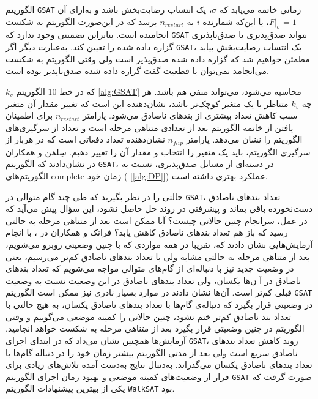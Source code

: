 الگوریتم 
\texttt{GSAT}
زمانی خاتمه می‌یابد  که 
$\sigma$، 
یک انتساب رضایت‌بخش باشد و به‌ازای آن 
$F|_{\sigma} = 1$، 
یا این‌که شمارنده 
$i$
به 
$n_{restart}$
برسد که در این‌صورت الگوریتم به شکست انجامیده است.  بنابراین تضمینی وجود ندارد که 
\texttt{GSAT}
بتواند صدق‌پذیری یا صدق‌ناپذیری گزاره داده شده را تعیین کند.   به‌عبارت  دیگر اگر 
\texttt{GSAT}،
یک انتساب رضایت‌بخش بیابد مطمئن خواهیم شد که گزاره داده شده صدق‌پذیر است ولی وقتی الگوریتم به شکست می‌انجامد  نمی‌توان با قطعیت گفت گزاره داده شده صدق‌ناپذیر بوده است.   


$k_{v}$
که در خط 
$10$
الگوریتم 
\ref{alg:GSAT}
محاسبه می‌شود، می‌تواند منفی هم باشد.  هر چه
$k_{v}$
متناظر با  یک متغیر  کوچک‌تر باشد، نشان‌دهنده این است که تغییر مقدار آن متغیر سبب کاهش تعداد بیشتری از بندهای ناصادق می‌شود.   پارامتر 
$n_{restart}$
برای اطمینان یافتن از خاتمه الگوریتم بعد از تعدادی متناهی مرحله  است و تعداد از سرگیری‌های الگوریتم را نشان می‌دهد. پارامتر 
$n_{flip}$
نشان‌دهنده تعداد دفعاتی است که در هربار از سرگیری الگوریتم، باید یک متغیر را انتخاب و مقدار آن را تغییر دهیم. سِلمَن و همکاران در 
\cite{selman1992new}
نشان‌دادند که الگوریتم 
\texttt{GSAT}،
در دسته‌ای از  مسائل صدق‌پذیری، نسبت به الگوریتم‌های 
\gls*{complete}
زمان خود (
[\ref{alg:DP}])
  عملکرد بهتری  داشته است.   
  
   حالتی را در نظر بگیرید که طی چند  گام متوالی در 
  \texttt{GSAT}، 
تعداد بندهای ناصادق دست‌نخورده باقی بماند  و پیشرفتی در روند  حل حاصل نشود، این سؤال پیش می‌آید که در عمل، سرانجام چنین حالاتی چیست؟ آیا ممکن است بعد از متناهی مرحله به حالتی رسید که باز هم تعداد بندهای ناصادق کاهش یابد؟     فرانک 
  و همکاران در  
 \cite{frank1997gravity}، 
با انجام آزمایش‌هایی نشان دادند که، تقریبا در همه مواردی که با چنین وضعیتی روبرو  می‌شویم،  بعد از متناهی مرحله به حالتی مشابه ولی با تعداد بندهای ناصادق کم‌تر می‌رسیم، یعنی در وضعیت جدید  نیز با دنباله‌ای از گام‌های متوالی مواجه می‌شویم که تعداد بندهای ناصادق در آ ن‌ها یکسان،  ولی تعداد بندهای ناصادق در این وضعیت نسبت به وضعیت قبلی کم‌تر است.  آن‌ها نشان دادند  در موارد  بسیار نادری نیز ممکن است  الگوریتم 
\texttt{GSAT}
در وضعیتی قرار بگیرد  که دنباله‌ی گام‌ها با تعداد بندهای ناصادق یکسان، به هیچ حالتی با تعداد بند ناصادق کم‌تر ختم نشود، چنین حالاتی را کمینه موضعی می‌گوییم و وقتی الگوریتم در چنین وضعیتی قرار بگیرد بعد از متناهی مرحله به شکست خواهد انجامید.  آزمایش‌ها همچنین نشان می‌داد  که در ابتدای اجرای 
\texttt{GSAT}، 
روند کاهش تعداد بندهای ناصادق سریع است ولی بعد از مدتی الگوریتم بیشتر زمان خود را در دنباله‌  گام‌ها با تعداد بندهای ناصادق یکسان می‌گذراند.   به‌دنبال نتایج به‌دست آمده تلاش‌های زیادی برای فرار از وضعیت‌های کمینه موضعی و بهبود زمان اجرای الگوریتم 
\texttt{GSAT}
صورت گرفت که یکی از بهترین پیشنهادات الگوریتم 
\texttt{WalkSAT}
بود.


